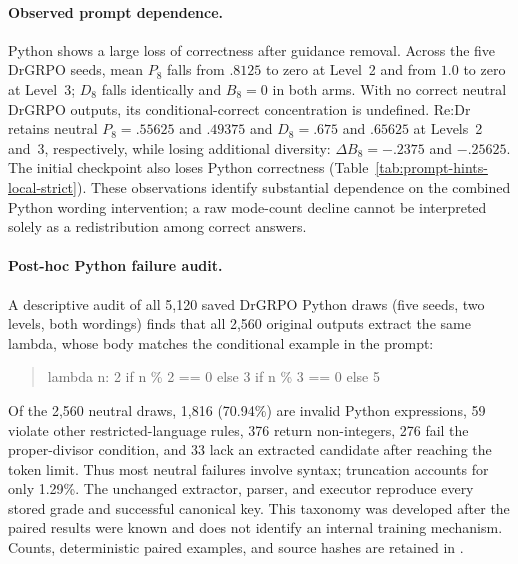 \documentclass{article}
\newcommand{\1}{\mathbf 1}
\theoremstyle{remark}
\theoremstyle{definition}
\theoremstyle{plain}
\begin{document}
\paragraph{Observed prompt dependence.}
Python shows a large loss of correctness after guidance removal. Across the
five DrGRPO seeds, mean $P_8$ falls from $.8125$ to zero at Level~2 and from
$1.0$ to zero at Level~3; $D_8$ falls identically and $B_8=0$ in both arms.
With no correct neutral DrGRPO outputs, its conditional-correct concentration
is undefined. Re:Dr retains neutral $P_8=.55625$ and $.49375$ and
$D_8=.675$ and $.65625$ at Levels~2 and~3, respectively, while losing
additional diversity: $\Delta B_8=-.2375$ and $-.25625$. The initial checkpoint
also loses Python correctness (Table~\ref{tab:prompt-hints-local-strict}).
These observations identify substantial dependence on the combined Python
wording intervention; a raw mode-count decline cannot be interpreted solely
as a redistribution among correct answers.


\paragraph{Post-hoc Python failure audit.}
A descriptive audit of all 5,120 saved DrGRPO Python draws (five seeds,
two levels, both wordings) finds that all 2,560 original outputs extract
the same lambda, whose body matches the conditional example in the prompt:
\begin{quote}\footnotesize\ttfamily
lambda n: 2 if n \% 2 == 0 else 3 if n \% 3 == 0 else 5
\end{quote}
Of the 2,560 neutral draws, 1,816 (70.94\%) are invalid Python expressions,
59 violate other restricted-language rules, 376 return non-integers,
276 fail the proper-divisor condition, and 33 lack an extracted candidate
after reaching the token limit. Thus most neutral failures involve syntax;
truncation accounts for only 1.29\%. The unchanged extractor, parser, and
executor reproduce every stored grade and successful canonical key.
This taxonomy was developed after the paired results were known and does
not identify an internal training mechanism. Counts, deterministic paired
examples, and source hashes are retained in
.
\end{document}
